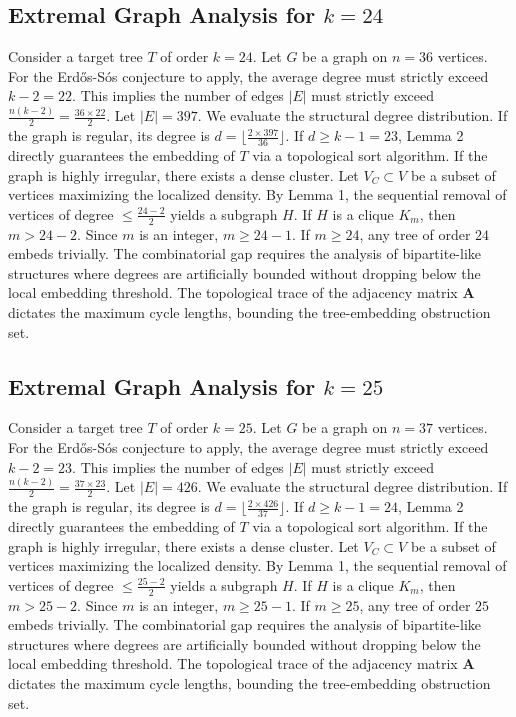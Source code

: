 \documentclass[11pt,a4paper]{article}
\begin{document}
\subsection{Extremal Graph Analysis for $k=24$}
Consider a target tree $T$ of order $k=24$.
Let $G$ be a graph on $n=36$ vertices.
For the Erd\H{o}s-S\'os conjecture to apply, the average degree must strictly exceed $k-2 = 22$.
This implies the number of edges $|E|$ must strictly exceed $\frac{n(k-2)}{2} = \frac{36 \times 22}{2}$.
Let $|E| = 397$.
We evaluate the structural degree distribution. If the graph is regular, its degree is $d = \lfloor \frac{2 \times 397}{36} \rfloor$.
If $d \geq k-1 = 23$, Lemma 2 directly guarantees the embedding of $T$ via a topological sort algorithm.
If the graph is highly irregular, there exists a dense cluster. Let $V_C \subset V$ be a subset of vertices maximizing the localized density.
By Lemma 1, the sequential removal of vertices of degree $\leq \frac{24-2}{2}$ yields a subgraph $H$.
If $H$ is a clique $K_{m}$, then $m > 24-2$. Since $m$ is an integer, $m \geq 24-1$. If $m \geq 24$, any tree of order $24$ embeds trivially.
The combinatorial gap requires the analysis of bipartite-like structures where degrees are artificially bounded without dropping below the local embedding threshold. The topological trace of the adjacency matrix $\mathbf{A}$ dictates the maximum cycle lengths, bounding the tree-embedding obstruction set.


\subsection{Extremal Graph Analysis for $k=25$}
Consider a target tree $T$ of order $k=25$.
Let $G$ be a graph on $n=37$ vertices.
For the Erd\H{o}s-S\'os conjecture to apply, the average degree must strictly exceed $k-2 = 23$.
This implies the number of edges $|E|$ must strictly exceed $\frac{n(k-2)}{2} = \frac{37 \times 23}{2}$.
Let $|E| = 426$.
We evaluate the structural degree distribution. If the graph is regular, its degree is $d = \lfloor \frac{2 \times 426}{37} \rfloor$.
If $d \geq k-1 = 24$, Lemma 2 directly guarantees the embedding of $T$ via a topological sort algorithm.
If the graph is highly irregular, there exists a dense cluster. Let $V_C \subset V$ be a subset of vertices maximizing the localized density.
By Lemma 1, the sequential removal of vertices of degree $\leq \frac{25-2}{2}$ yields a subgraph $H$.
If $H$ is a clique $K_{m}$, then $m > 25-2$. Since $m$ is an integer, $m \geq 25-1$. If $m \geq 25$, any tree of order $25$ embeds trivially.
The combinatorial gap requires the analysis of bipartite-like structures where degrees are artificially bounded without dropping below the local embedding threshold. The topological trace of the adjacency matrix $\mathbf{A}$ dictates the maximum cycle lengths, bounding the tree-embedding obstruction set.
\end{document}
